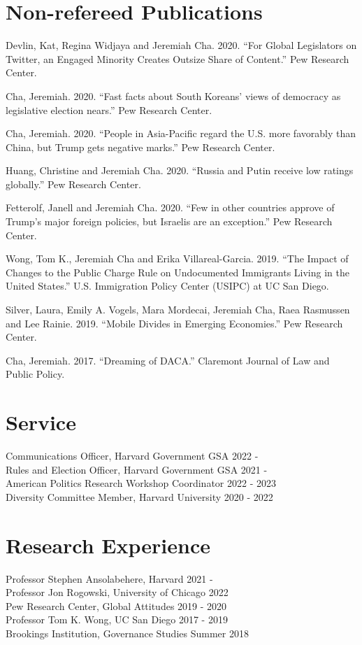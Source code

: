 \documentclass[margin, line]{res}
\begin{document}
\begin{resume}
\section{Non-refereed Publications}
\begin{etaremune}
	\item Devlin, Kat, Regina Widjaya and Jeremiah Cha. 2020. ``For Global Legislators on Twitter, an Engaged Minority Creates Outsize Share of Content.'' Pew Research Center.
	\item Cha, Jeremiah. 2020. ``Fast facts about South Koreans’ views of democracy as legislative election nears.'' Pew Research Center.
	\item Cha, Jeremiah. 2020. ``People in Asia-Pacific regard the U.S. more favorably than China, but Trump gets negative marks.'' Pew Research Center.
	\item Huang, Christine and Jeremiah Cha. 2020. ``Russia and Putin receive low ratings globally.'' Pew Research Center.
	\item Fetterolf, Janell and Jeremiah Cha. 2020. ``Few in other countries approve of Trump’s major foreign policies, but Israelis are an exception.'' Pew Research Center.
	\item Wong, Tom K., Jeremiah Cha and Erika Villareal-Garcia. 2019. ``The Impact of Changes to the Public Charge Rule on Undocumented Immigrants Living in the United States.'' U.S. Immigration Policy Center (USIPC) at UC San Diego.
	\item Silver, Laura, Emily A. Vogels, Mara Mordecai, Jeremiah Cha, Raea Rasmussen and Lee Rainie. 2019. ``Mobile Divides in Emerging Economies.'' Pew Research Center.
	\item Cha, Jeremiah. 2017. ``Dreaming of DACA.'' Claremont Journal of Law and Public Policy.
\end{etaremune}

\section{Service}
Communications Officer, Harvard Government GSA \hfill 2022 - \\
Rules and Election Officer, Harvard Government GSA \hfill 2021 -\\
American Politics Research Workshop Coordinator \hfill 2022 - 2023\\
Diversity Committee Member, Harvard University \hfill 2020 - 2022

\section{Research Experience}
Professor Stephen Ansolabehere, Harvard \hfill 2021 - \\
Professor Jon Rogowski, University of Chicago \hfill 2022\\
Pew Research Center, Global Attitudes \hfill 2019 - 2020\\
Professor Tom K. Wong, UC San Diego \hfill 2017 - 2019\\
Brookings Institution, Governance Studies \hfill Summer 2018


\end{resume}
\end{document}
